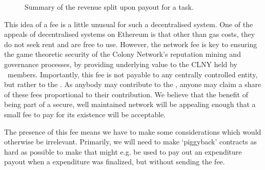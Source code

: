 \begin{figure}[htp]
\centering
 \caption{Summary of the revenue split upon payout for a task.}
 \label{fig:revenueSplit}

\end{figure}

This idea of a fee is a little unusual for such a decentralised system. One of the appeals of decentralised systems on Ethereum is that other than gas costs, they do not seek rent and are free to use. However, the network fee is key to ensuring the game theoretic security of the Colony Network's reputation mining and governance processes, by providing underlying value to the CLNY held by \rc\ members. Importantly, this fee is not payable to any centrally controlled entity, but rather to the \rc. As anybody may contribute to the \rc, anyone may claim a share of these fees proportional to their contribution. We believe that the benefit of being part of a secure, well maintained network will be appealing enough that a small fee to pay for its existence will be acceptable.

The presence of this fee means we have to make some considerations which would otherwise be irrelevant. Primarily, we will need to make `piggyback' contracts as hard as possible to make that might e.g. be used to pay out an expenditure payout when a expenditure was finalized, but without sending the fee.

